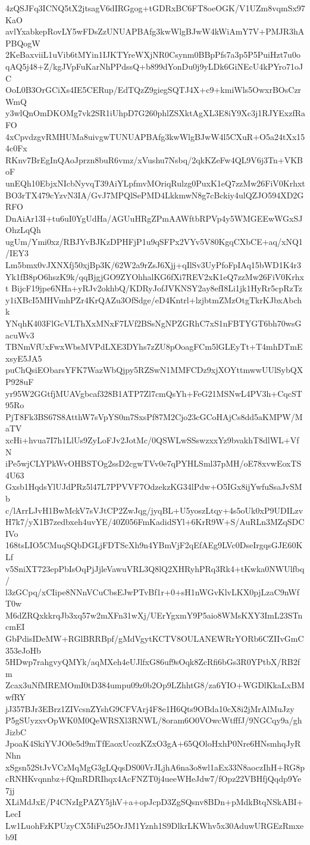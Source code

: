 4zQSJFq3ICNQ5tX2jtsagV6dIRGgog+tGDRxBC6FT8oeOGK/V1UZm8vqmSx97KaO
avlYxabkepRovLY5wFDsZzUNUAPBAfg3kwWlgBJwW4kWiAmY7V+PMJR3hAPBQogW
2KeBaxviiL1uVib6tMYin1IJKTYreWXjNR0Csynm0BBpPfs7a3p5P5PuiHzt7u0o
qAQ5j48+Z/kgJVpFuKarNhPPdssQ+b899dYonDu0j9yLDk6GiNEcU4kPYro71oJC
OoL0B3OrGCiXs4IE5CERup/EdTQzZ9giegSQTJ4X+c9+kmiWls5OwxrBOsCzrWmQ
y3wlQnOmDKOMg7vk2SR1iUhpD7G260phlZSXktAgXL3E8iY9Xc3j1RJYExzfRaFO
4xCpvdzgvRMHUMa8uivgwTUNUAPBAfg3kwWlgBJwW4l5CXuR+O5a24tXx154c0Fx
RKnv7BrEgInQAoJprzn8buR6vmz/xVushu7Nsbq/2qkKZeFw4QL9V6j3Tn+VKBoF
unEQh10EbjxNIcbNyvqT39AiYLpfmvMOriqRulzg0PuxK1eQ7zzMw26FiV0Krhxt
BO3rTX479cYzvN3IA/GvJ7MPQlSePMD4LkkmwN8g7cBckiy4ulQZJO594XD2GRFO
DnAiAr13I+tu6uI0YgUdHa/AGUuHRgZPmAAWftbRPVp4y5WMGEEwWGxSJOhzLqQh
ugUm/Ymi0xz/RBJYvBJKzDPHFjP1u9qSFPx2VYv5V80KgqCXbCE+aq/xNQ1/IEY3
Lm5bmx0vJXNXfj50xjBp3K/62W2a9rZsJ6Xjj+qIlSv3UyPfoFpIAq15bWD1K4r3
Yk1fB8pO6hszK9k/qqBjgjGO9ZYOhhalKG6fXi7REV2xK1eQ7zzMw26FiV0Krhxt
BijcF19jpe6NHa+yRJv2okhbQ/KDRyJofJVKNSY2ay8efI8Li1jk1HyRr5cpRzTz
y1iXBcI5MHVmhPZr4KrQAZu3OfSdge/eD4Kntrl+lzjbtmZMzOtgTkrKJbxAbchk
YNqhK403FlGcVLThXxMNxF7LVf2BSsNgNPZGRhC7xS1nFBTYGT6bh70wsGacuWv3
TBNmVfUxFwxWbsMVPdLXE3DYhs7zZU8pOoagFCm5lGLEyTt+T4mhDTmExsyE5JA5
puChQsiEObarsYFK7WazWbQjpy5RZSwN1MMFCDz9xjXOYttmwwUUlSybQXP928uF
yr95W2GGtfjMUAVgbcaf328B1ATP7Zl7cmQsYh+FeG21MSNwL4PV3h+CqcST95Ro
PjT8Fk3BS67S8AtthW7sVpYS0m7SxsPf87M2Cjo23cGCoHAjCs8dd5aKMPW/MaTV
xcHi+hvua7I7h1LlUs9ZyLoFJv2JotMc/0QSWLwSSswzxxYz9bvakhT8dlWL+VfN
iPe5wjCLYPkWvOHBSTOg2ssD2cgwTVv0e7qPYHLSml37pMH/oE78xvwEoxTS4U63
Gxsb1HqdsYlUJdPRz5l47L7PPVVF7OdzekzKG34lPdw+O5IGx8ijYwfuSsaJvSMb
c/lArrLJvH1BwMckV7sVJtCP2ZwJqg/jyqBL+U5yoszLtqy+4s5oUk0xP9UDILzv
H7k7/yX1B7zedbxeh4uvYE/40Z056FmKadidSYl+6KrR9W+S/AuRLn3MZqSDCIVo
168tsLIO5CMuqSQbDGLjFDTScXh9n4YBmVjF2qEfAEg9LVc0DseIrgqsGJE60KLf
v5SniXT723epPbIsOqPjJjleVawuVRL3Q8lQ2XHRyhPRq3Rk4+tKwka0NWUlfbq/
l3zGCpq/xCIipe8NNnVCuCbsEJwPTvBf1r+0+sH1nWGvKlvLKX0pjLzaC9nWfT0w
M6dZRQxkkrqJb3xq57w2mXFn31wXj/UErYgxmY9P5aio8WMsKXY3ImL23STncmEI
GbPdisIDeMW+RGlBRRBpf/gMdVgytKCTV8OULANEWRrYORb6CZIIvGmC353eJoHb
5HDwp7rahgvyQMYk/aqMXeh4eUJlfxG86uf9sOqk8ZcRfi6bGs3R0YPtbX/RB2fm
Zcax3uNfMREMOmI0tD384umpu09z0b2Op9LZhhtG8/za6YIO+WGDlKkaLxBMwfRY
jJ357BJr3EBrz1ZIVcsnZYshG9CFVArj4F8e1H6Qts9OBda10cX8i2jMrAlMuJzy
P5gSUyzxvOpWK0M0QeWRSXl3RNWL/8oram6O0VOwcWtfffJ/9NGCqy9a/ghJizbC
JpoaK4SkiYVJO0e5d9mTfEaoxUcozKZxO3gA+65QOloHxhP0Nre6HNsmhqJyRNhn
xSgsn52StJvVCzMqMgG3gLQqsDS00VrJLjhA6na3o8wl1aEx33N8aoczIhH+RG8p
cRNHKvqnnbz+fQmRDRIhqx4AcFNZT0j4ueeWHeJdw7/fOpz22VBHfjQqdp9Ye7jj
XLiMdJxE/P4CNzIgPAZY5jhV+a+opJcpD3ZgSQsnv8BDn+pMdkBtqNSkABI+LecI
Lw1LuohFzKPUzyCX5IiFu25OrJM1Yznh1S9DlkrLKWhv5x30AduwURGEzRmxeb9I

